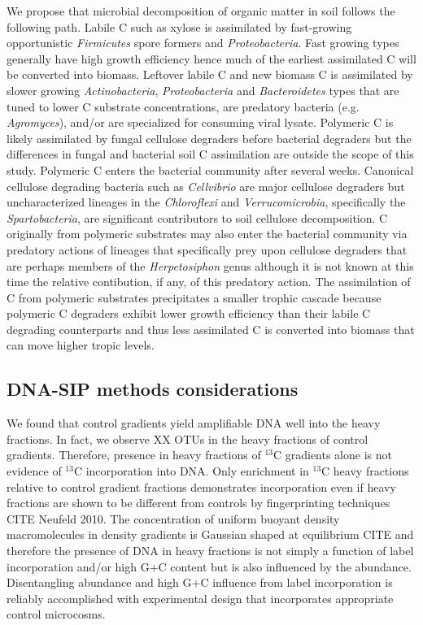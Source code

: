 We propose that microbial decomposition of organic matter in soil follows the
following path. Labile C such as xylose is assimilated by fast-growing
opportunistic \textit{Firmicutes} spore formers and \textit{Proteobacteria}.
Fast growing types generally have high growth efficiency hence much of the
earliest assimilated C will be converted into biomass. Leftover labile C and
new biomass C is assimilated by slower growing \textit{Actinobacteria},
\textit{Proteobacteria} and \textit{Bacteroidetes} types that are tuned to
lower C substrate concentrations, are predatory bacteria (e.g. \textit{Agromyces}),
and/or are specialized for consuming viral lysate. Polymeric C is likely
assimilated by fungal cellulose degraders before bacterial degraders but the
differences in fungal and bacterial soil C assimilation are outside the scope
of this study. Polymeric C enters the bacterial community after several weeks.
Canonical cellulose degrading bacteria such as \textit{Cellvibrio} are major
cellulose degraders but uncharacterized lineages in the \textit{Chloroflexi}
and \textit{Verrucomicrobia}, specifically the \textit{Spartobacteria}, are
significant contributors to soil cellulose decomposition. C originally from
polymeric substrates may also enter the bacterial community via predatory
actions of lineages that specifically prey upon cellulose degraders that are
perhaps members of the \textit{Herpetosiphon} genus although it is not known at
this time the relative contibution, if any, of this predatory action. The assimilation of
C from polymeric substrates precipitates a smaller trophic cascade because
polymeric C degraders exhibit lower growth efficiency than their labile C
degrading counterparts and thus less assimilated C is converted into biomass that
can move higher tropic levels.

\subsection{DNA-SIP methods considerations}
We found that control gradients yield amplifiable DNA well into the heavy
fractions. In fact, we observe XX OTUs in the heavy fractions of control
gradients. Therefore, presence in heavy fractions of $^{13}$C gradients alone
is not evidence of $^{13}$C incorporation into DNA. Only enrichment in
$^{13}$C heavy fractions relative to control gradient fractions demonstrates
incorporation even if heavy fractions are shown to be different from controls
by fingerprinting techniques CITE Neufeld 2010. The concentration of uniform
buoyant density macromolecules in density gradients is Gaussian shaped at
equilibrium CITE and therefore the presence of DNA in heavy fractions is not
simply a function of label incorporation and/or high G+C content but is also
influenced by the abundance. Disentangling abundance and high G+C influence
from label incorporation is reliably accomplished with experimental design that
incorporates appropriate control microcosms.

